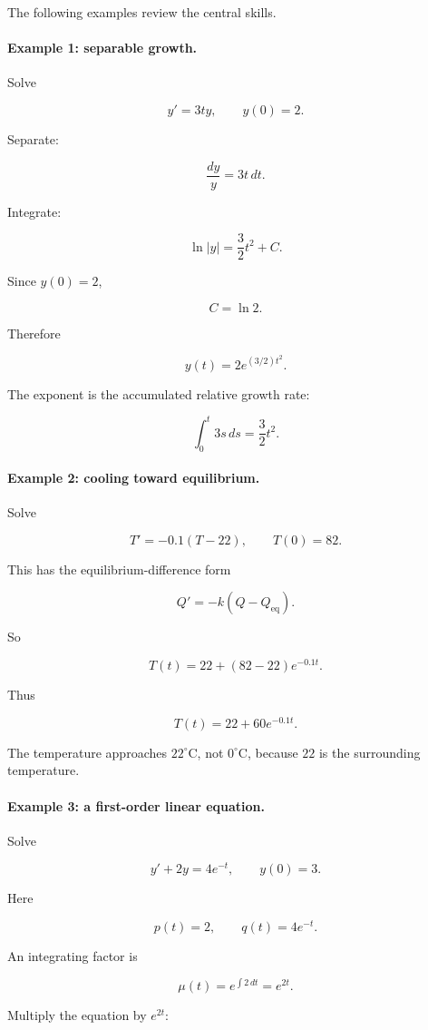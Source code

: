 The following examples review the central skills.

\paragraph{Example 1: separable growth.}
Solve

\[
y'=3ty,
\qquad
y(0)=2.
\]

Separate:

\[
\frac{dy}{y}=3t\,dt.
\]

Integrate:

\[
\ln|y|=\frac32t^2+C.
\]

Since \(y(0)=2\),

\[
C=\ln2.
\]

Therefore

\[
\boxed{
y(t)=2e^{(3/2)t^2}.
}
\]

The exponent is the accumulated relative growth rate:

\[
\int_0^t 3s\,ds=\frac32t^2.
\]

\paragraph{Example 2: cooling toward equilibrium.}
Solve

\[
T'=-0.1(T-22),
\qquad
T(0)=82.
\]

This has the equilibrium-difference form

\[
Q'=-k(Q-Q_{\text{eq}}).
\]

So

\[
T(t)=22+(82-22)e^{-0.1t}.
\]

Thus

\[
\boxed{
T(t)=22+60e^{-0.1t}.
}
\]

The temperature approaches \(22^\circ\text{C}\), not \(0^\circ\text{C}\), because \(22\) is
the surrounding temperature.

\paragraph{Example 3: a first-order linear equation.}
Solve

\[
y'+2y=4e^{-t},
\qquad
y(0)=3.
\]

Here

\[
p(t)=2,
\qquad
q(t)=4e^{-t}.
\]

An integrating factor is

\[
\mu(t)=e^{\int 2\,dt}=e^{2t}.
\]

Multiply the equation by \(e^{2t}\):


